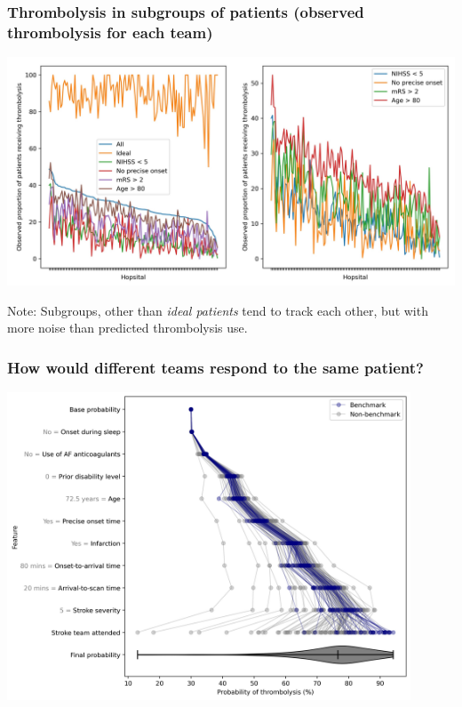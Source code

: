 \documentclass{beamer}
\begin{document}
\begin{frame}
\frametitle{Thrombolysis in subgroups of patients (observed thrombolysis for each team)}

    \begin{center}
    \includegraphics[width=1.0\textwidth]{./images/15a_actual_subgroup.jpg}
    \end{center}

\footnotesize Note: Subgroups, other than \emph{ideal patients} tend to track each other, but with more noise than predicted thrombolysis use. 

\end{frame}



\begin{frame}
\frametitle{How would different teams respond to the same patient?}

    \begin{center}
    \includegraphics[width=0.9\textwidth]{./images/shap_waterfall_with_violin.jpg}
    \end{center}

\end{frame}
\end{document}
